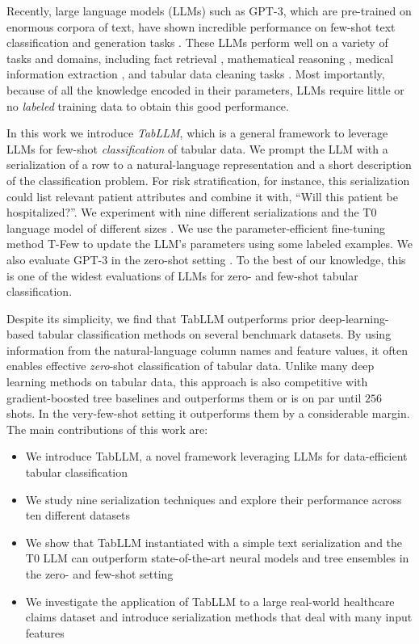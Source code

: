 Recently, large language models (LLMs) such as \mbox{GPT-3}, which are pre-trained on enormous corpora of text, have shown incredible performance on few-shot text classification and generation tasks \citep{brown_language_2020, sanh_multitask_2021, ouyang_training_2022}. These LLMs perform well on a variety of tasks and domains, including fact retrieval \citep{liu_gpt_2021}, mathematical reasoning \citep{wei_chain_2022}, medical information extraction \citep{agrawal_large_2022}, and tabular data cleaning tasks  \citep{narayan_can_2022}. Most importantly, because of all the knowledge encoded in their parameters, LLMs require little or no \emph{labeled} training data to obtain this good performance.

In this work we introduce \textit{TabLLM}, which is a general framework to leverage LLMs for few-shot \emph{classification} of tabular data. We prompt the LLM with a serialization of a row to a natural-language representation and a short description of the classification problem. For risk stratification, for instance, this serialization could list relevant patient attributes and combine it with, ``Will this patient be hospitalized?''. We experiment with nine different serializations and the T0 language model of different sizes \citep{sanh_multitask_2021}. We use the parameter-efficient fine-tuning method T-Few \citep{liu_few-shot_2022} to update the LLM's parameters using some labeled examples. We also evaluate GPT-3 in the zero-shot setting \citep{brown_language_2020}. To the best of our knowledge, this is one of the widest evaluations of LLMs for zero- and few-shot tabular classification.

Despite its simplicity, we find that TabLLM outperforms prior deep-learning-based tabular classification methods on several benchmark datasets. By using information from the natural-language column names and feature values, it often enables effective \emph{zero}-shot classification of tabular data. Unlike many deep learning methods on tabular data, this approach is also competitive with gradient-boosted tree baselines and outperforms them or is on par until $256$ shots. In the very-few-shot setting it outperforms them by a considerable margin. The main contributions of this work are:

\begin{itemize}

    \item We introduce TabLLM, a novel framework leveraging LLMs for data-efficient tabular classification \item We study nine serialization techniques and explore their performance across ten different datasets \item We show that TabLLM instantiated with a simple text serialization and the T0 LLM can outperform state-of-the-art neural models and tree ensembles in the zero- and few-shot setting \item We investigate the application of TabLLM to a large real-world healthcare claims dataset and introduce serialization methods that deal with many input features
\end{itemize}

